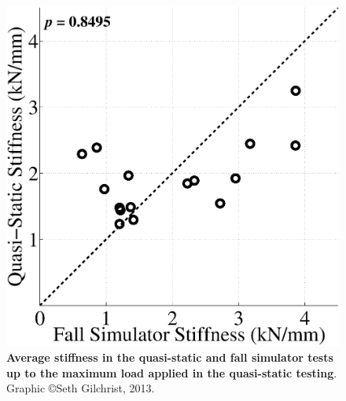 \begin{figure}[h]
\centering
\includegraphics[width=\linewidth]{./appendixPlots/figures/StiffnessVsStiffness}
\caption[Quasi-static vs.\ fall simulator stiffness]{\textbf{Average stiffness in the quasi-static and fall simulator tests up to the maximum load applied in the quasi-static testing}. Graphic \copyright Seth Gilchrist, 2013.}
\label{fig:StiffnessVsStiffness}
\end{figure}
\clearpage

